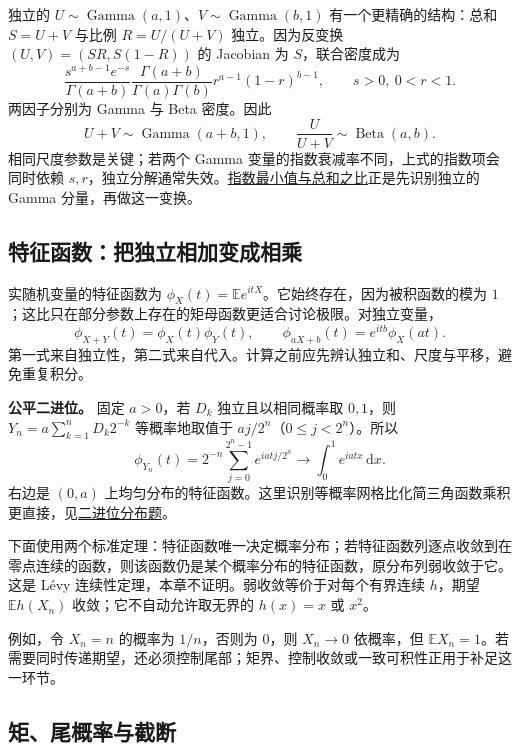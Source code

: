 \documentclass[UTF8,12pt,a4paper,fontset=fandol]{ctexbook}
\begin{document}
独立的 $U\sim\operatorname{Gamma}(a,1)$、$V\sim\operatorname{Gamma}(b,1)$ 有一个更精确的结构：总和 $S=U+V$ 与比例 $R=U/(U+V)$ 独立。因为反变换 $(U,V)=(SR,S(1-R))$ 的 Jacobian 为 $S$，联合密度成为
\[
\frac{s^{a+b-1}e^{-s}}{\Gamma(a+b)}
\frac{\Gamma(a+b)}{\Gamma(a)\Gamma(b)}r^{a-1}(1-r)^{b-1},
\qquad s>0,\ 0<r<1.
\]
两因子分别为 Gamma 与 Beta 密度。因此
\[
U+V\sim\operatorname{Gamma}(a+b,1),\qquad
\frac U{U+V}\sim\operatorname{Beta}(a,b).
\]
相同尺度参数是关键；若两个 Gamma 变量的指数衰减率不同，上式的指数项会同时依赖 $s,r$，独立分解通常失效。\hyperref[pr:fin16-high:12]{指数最小值与总和之比}正是先识别独立的 Gamma 分量，再做这一变换。

\subsection{特征函数：把独立相加变成相乘}

\label{app:probability-characteristic}

实随机变量的特征函数为 $\phi_X(t)=\mathbb Ee^{itX}$。它始终存在，因为被积函数的模为 $1$；这比只在部分参数上存在的矩母函数更适合讨论极限。对独立变量，
\[
\phi_{X+Y}(t)=\phi_X(t)\phi_Y(t),\qquad
\phi_{aX+b}(t)=e^{itb}\phi_X(at).
\]
第一式来自独立性，第二式来自代入。计算之前应先辨认独立和、尺度与平移，避免重复积分。

\textbf{公平二进位。} 固定 $a>0$，若 $D_k$ 独立且以相同概率取 $0,1$，则 $Y_n=a\sum_{k=1}^nD_k2^{-k}$ 等概率地取值于 $a j/2^n$（$0\le j<2^n$）。所以
\[
\phi_{Y_n}(t)=2^{-n}\sum_{j=0}^{2^n-1}e^{iatj/2^n}
\longrightarrow\int_0^1e^{iatx}\,\mathrm dx.
\]
右边是 $(0,a)$ 上均匀分布的特征函数。这里识别等概率网格比化简三角函数乘积更直接，见\hyperref[pr:fin08-hi:13]{二进位分布题}。

下面使用两个标准定理：特征函数唯一决定概率分布；若特征函数列逐点收敛到在零点连续的函数，则该函数仍是某个概率分布的特征函数，原分布列弱收敛于它。这是 Lévy 连续性定理，本章不证明。弱收敛等价于对每个有界连续 $h$，期望 $\mathbb Eh(X_n)$ 收敛；它不自动允许取无界的 $h(x)=x$ 或 $x^2$。

例如，令 $X_n=n$ 的概率为 $1/n$，否则为 $0$，则 $X_n\to0$ 依概率，但 $\mathbb EX_n=1$。若需要同时传递期望，还必须控制尾部；矩界、控制收敛或一致可积性正用于补足这一环节。

\subsection{矩、尾概率与截断}

\label{app:probability-moments}
\end{document}
